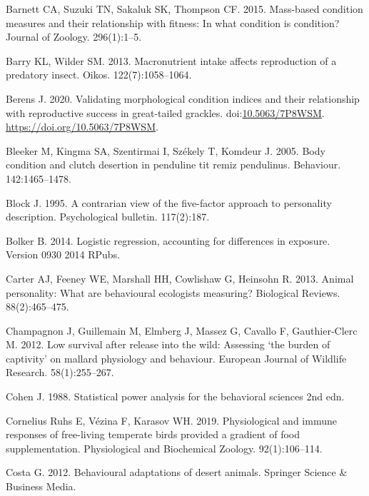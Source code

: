 \documentclass[
]{article}
\begin{document}
\leavevmode\hypertarget{ref-barnett2015mass}{}%
Barnett CA, Suzuki TN, Sakaluk SK, Thompson CF. 2015. Mass-based
condition measures and their relationship with fitness: In what
condition is condition? Journal of Zoology. 296(1):1--5.

\leavevmode\hypertarget{ref-barry2013macronutrient}{}%
Barry KL, Wilder SM. 2013. Macronutrient intake affects reproduction of
a predatory insect. Oikos. 122(7):1058--1064.

\leavevmode\hypertarget{ref-berens2020conditiondata}{}%
Berens J. 2020. Validating morphological condition indices and their
relationship with reproductive success in great-tailed grackles.
doi:\href{https://doi.org/10.5063/7P8WSM}{10.5063/7P8WSM}.
\url{https://doi.org/10.5063/7P8WSM}.

\leavevmode\hypertarget{ref-bleeker2005body}{}%
Bleeker M, Kingma SA, Szentirmai I, Székely T, Komdeur J. 2005. Body
condition and clutch desertion in penduline tit remiz pendulinus.
Behaviour. 142:1465--1478.

\leavevmode\hypertarget{ref-block1995contrarian}{}%
Block J. 1995. A contrarian view of the five-factor approach to
personality description. Psychological bulletin. 117(2):187.

\leavevmode\hypertarget{ref-bolker2014logistic}{}%
Bolker B. 2014. Logistic regression, accounting for differences in
exposure. Version 0930 2014 RPubs.

\leavevmode\hypertarget{ref-carter2013animal}{}%
Carter AJ, Feeney WE, Marshall HH, Cowlishaw G, Heinsohn R. 2013. Animal
personality: What are behavioural ecologists measuring? Biological
Reviews. 88(2):465--475.

\leavevmode\hypertarget{ref-champagnon2012low}{}%
Champagnon J, Guillemain M, Elmberg J, Massez G, Cavallo F,
Gauthier-Clerc M. 2012. Low survival after release into the wild:
Assessing `the burden of captivity' on mallard physiology and behaviour.
European Journal of Wildlife Research. 58(1):255--267.

\leavevmode\hypertarget{ref-cohen1988statistical}{}%
Cohen J. 1988. Statistical power analysis for the behavioral sciences
2nd edn.

\leavevmode\hypertarget{ref-cornelius2019physiological}{}%
Cornelius Ruhs E, Vézina F, Karasov WH. 2019. Physiological and immune
responses of free-living temperate birds provided a gradient of food
supplementation. Physiological and Biochemical Zoology. 92(1):106--114.

\leavevmode\hypertarget{ref-costa2012behavioural}{}%
Costa G. 2012. Behavioural adaptations of desert animals. Springer
Science \& Business Media.
\end{document}
